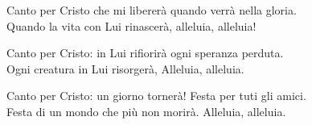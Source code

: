 
 

\spazio

\strofa Canto per Cristo che mi libererà quando verrà nella gloria.\\
Quando la vita con Lui rinascerà, alleluia, alleluia!

\spazio

 

\spazio

\strofa Canto per Cristo: in Lui rifiorirà ogni speranza perduta.\\
Ogni creatura in Lui risorgerà, Alleluia, alleluia.

\spazio

 

\spazio

\strofa Canto per Cristo: un giorno tornerà! Festa per tuti gli amici.\\
Festa di un mondo che più non morirà. Alleluia, alleluia.

\spazio

 